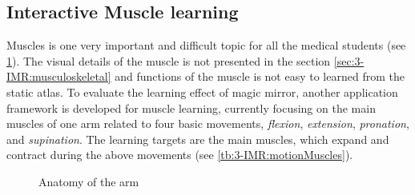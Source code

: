 \subsection{Interactive Muscle learning}
Muscles is one very important and difficult topic for all the medical students (see \figurename{\ref{fig:3-IMR:armAnatomy}}). The visual details of the muscle is not presented in the section \ref{sec:3-IMR:musculoskeletal} and functions of the muscle is not easy to learned from the static atlas.  
To evaluate the learning effect of magic mirror, another application framework is developed for muscle learning, currently focusing on the main muscles of one arm related to four basic movements, \textit{flexion}, \textit{extension}, \textit{pronation}, and \textit{supination}. 
The learning targets are the main muscles, which expand and contract during the above movements (see \tablename{\ref{tb:3-IMR:motionMuscles}}).
\begin{figure}
	\centering
	\caption{Anatomy of the arm}
	\label{fig:3-IMR:armAnatomy}
\end{figure}

